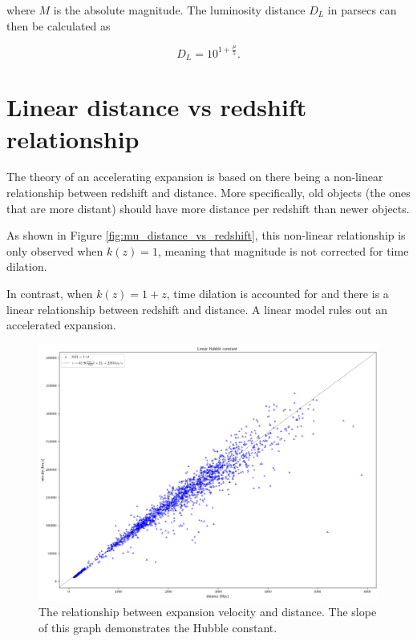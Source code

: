\documentclass{article}
\begin{document}
where $M$ is the absolute magnitude. The luminosity distance $D_L$ in parsecs
can then be calculated as

\begin{equation}
  D_L = 10^{1 + \frac{\mu}{5}}.
\end{equation}

\section{Linear distance vs redshift relationship}
\label{hubblelaw}

The theory of an accelerating expansion is based on there being a non-linear
relationship between redshift and distance. More specifically, old objects (the
ones that are more distant) should have more distance per redshift than newer
objects.

As shown in Figure \ref{fig:mu_distance_vs_redshift}, this non-linear
relationship is only observed when $k(z) = 1$, meaning that magnitude is not
corrected for time dilation.

In contrast, when $k(z) = 1 + z$, time dilation is accounted for and there is a
linear relationship between redshift and distance. A linear model rules out an
accelerated expansion.

\begin{figure}[ht]
  \includegraphics[width=\linewidth]{velocity_vs_distance.png}
  \caption{The relationship between expansion velocity and distance. The slope of this graph demonstrates the Hubble constant.
  }
\end{figure}
\end{document}
